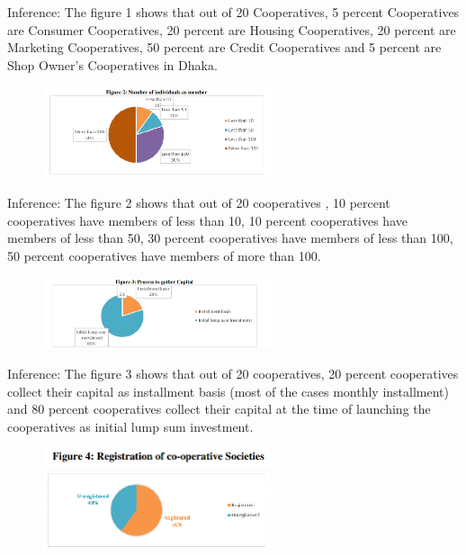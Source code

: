   Inference: The figure 1 shows that out of 20 Cooperatives, 5 percent Cooperatives are Consumer Cooperatives, 
  20 percent are Housing Cooperatives, 20 percent are Marketing Cooperatives, 50 percent are Credit 
  Cooperatives and 5 percent are Shop Owner’s Cooperatives in Dhaka. 
  
  \begin{figure}[h]
    \centering
    \includegraphics[width=0.6\textwidth]{Chap1/figure2.PNG}
    \label{fig:example}
  \end{figure}

  Inference: The figure 2 shows that out of 20 cooperatives , 10 percent cooperatives have members of less than 
10, 10 percent cooperatives have members of less than 50, 30 percent cooperatives have members of less than 
100, 50 percent cooperatives have members of more than 100. 

\begin{figure}[h]
    \centering
    \includegraphics[width=0.6\textwidth]{Chap1/figure3.PNG}
    \label{fig:example}
  \end{figure}

  Inference: The figure 3 shows that out of 20 cooperatives, 20 percent cooperatives collect their capital as 
installment basis (most of the cases monthly installment) and 80 percent cooperatives collect their capital at the 
time of launching the cooperatives as initial lump sum investment. 

\begin{figure}[h]
    \centering
    \includegraphics[width=0.6\textwidth]{Chap1/figure4.1.PNG}
    \label{fig:example}
    \centering
    \includegraphics[width=0.6\textwidth]{Chap1/figure4.PNG}
    \label{fig:example}
  \end{figure}

